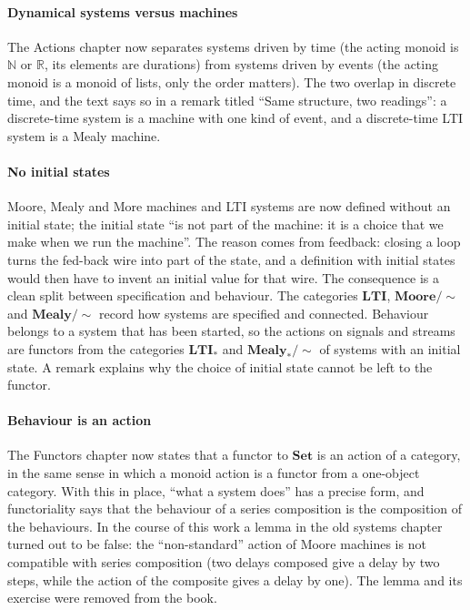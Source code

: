 \documentclass[11pt,a4paper]{article}
\newcommand{\cat}[1]{\mathbf{#1}}
\newcommand{\R}{\mathbb{R}}
\begin{document}
\paragraph{Dynamical systems versus machines} The Actions chapter now separates systems driven by
time (the acting monoid is $\mathbb{N}$ or $\R$, its elements are durations) from systems driven
by events (the acting monoid is a monoid of lists, only the order matters). The two overlap in
discrete time, and the text says so in a remark titled ``Same structure, two readings'': a
discrete-time system is a machine with one kind of event, and a discrete-time LTI system is a
Mealy machine.

\paragraph{No initial states} Moore, Mealy and More machines and LTI systems are now defined
without an initial state; the initial state ``is not part of the machine: it is a choice that we make when we run the
machine''. The
reason comes from feedback: closing a loop turns the fed-back wire into part of the state, and a
definition with initial states would then have to invent an initial value for that wire. The
consequence is a clean split between specification and behaviour. The categories $\cat{LTI}$,
$\cat{Moore}/{\sim}$ and $\cat{Mealy}/{\sim}$ record how systems are specified and connected.
Behaviour belongs to a system that has been started, so the actions on signals and streams are
functors from the categories $\cat{LTI}_*$ and $\cat{Mealy}_*/{\sim}$ of systems with an initial
state. A remark explains why the choice of initial state cannot be left to the functor.

\paragraph{Behaviour is an action} The Functors chapter now states that a functor to $\cat{Set}$
is an action of a category, in the same sense in which a monoid action is a functor from a
one-object category. With this in place, ``what a system does'' has a precise form, and
functoriality says that the behaviour of a series composition is the composition of the
behaviours. In the course of this work a lemma in the old systems chapter turned out to be false:
the ``non-standard'' action of Moore machines is not compatible with series composition (two
delays composed give a delay by two steps, while the action of the composite gives a delay by
one). The lemma and its exercise were removed from the book.
\end{document}
